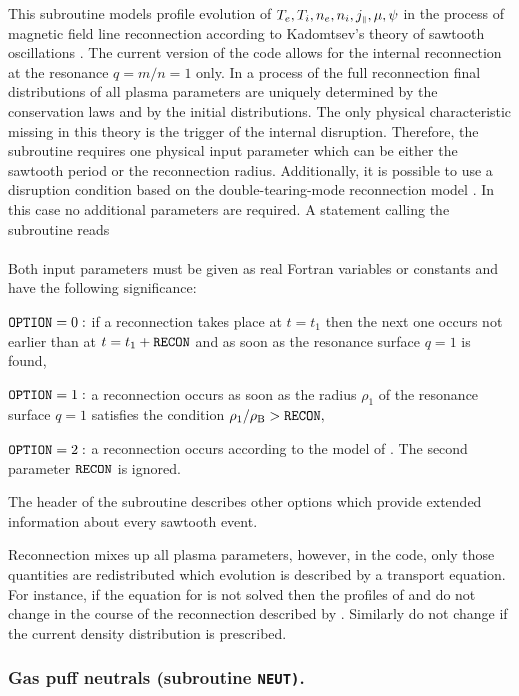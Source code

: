 This subroutine models profile evolution of 
$T_e,T_i,n_e,n_i,j_{\scriptscriptstyle\parallel},\mu,\psi$ 
in the process of magnetic field line reconnection according to
Kadomtsev's theory of sawtooth oscillations \cite{BB}.
The current version of the code allows for the internal reconnection at
the resonance $q=m/n=1$ only.
In a process of the full reconnection final distributions of all plasma
parameters are uniquely determined by the conservation laws and by the
initial distributions. 
The only physical characteristic missing in  this theory is the trigger
of the internal disruption.
Therefore, the subroutine  requires one physical input
parameter which can be either the sawtooth period or the reconnection
radius.
Additionally, it is possible to use a disruption condition
based on the double-tearing-mode reconnection model \cite{PP}.
In this case no additional parameters are required.
A statement calling the subroutine reads
\\ \indent
{}
\\
Both input parameters must be given as real Fortran variables or
constants and have the following significance:
\begin{description}
\item
${\tt OPTION}=0:$ if a reconnection takes place at $t=t_1$ then the
next one occurs not earlier than at $t=t_1+\tt RECON$ and as soon as
the resonance surface $q=1$ is found,
\item
${\tt OPTION}=1:$ a reconnection occurs as soon as the radius $\rho_1$
of the resonance surface $q=1$ satisfies the condition
$\rho_1/\rho_{\rm B}>{\tt RECON},$ 
\item
${\tt OPTION}=2:$ a reconnection occurs according to the model of
\cite{PP}. 
The second parameter $\tt RECON$ is ignored.
\end{description}
The header of the subroutine  describes other options which
provide extended information about every sawtooth event.

Reconnection mixes up all plasma parameters, however, in the code,
only those quantities are redistributed which evolution is described by
a transport equation.
For instance, if the equation for  is not solved then the
profiles of  and  do not change in the course of the
reconnection described by .
Similarly  do not change if the current density
distribution is prescribed.

\subsubsection{Gas puff neutrals {\rm (subroutine \tt NEUT)}.} 

